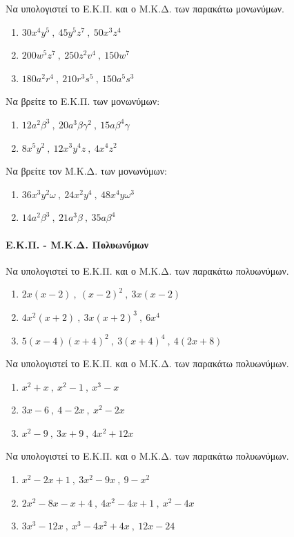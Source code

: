 \documentclass[11pt,a4paper,modern]{FFExercises}
\begin{document}
\askhsh
Να υπολογιστεί το Ε.Κ.Π. και ο Μ.Κ.Δ. των παρακάτω μονωνύμων.
\begin{enumerate}[label=\roman*.]
    \item $ 30x^4y^5\ ,\ 45y^5z^7\ ,\ 50x^3z^4 $
    \item $ 200w^5z^7\ ,\ 250z^2v^4\ ,\ 150w^7 $
    \item $ 180a^2r^4\ ,\ 210r^3s^5\ ,\ 150a^5s^3 $
\end{enumerate}

\askhsh
Να βρείτε το Ε.Κ.Π. των μονωνύμων:
\begin{enumerate}[label=\roman*.]
    \item $ 12a^2\beta^3\ ,\ 20a^3\beta\gamma^2\ ,\ 15a\beta^4\gamma $
    \item $ 8x^5y^2\ ,\ 12x^3y^4z\ ,\ 4x^4z^2 $
\end{enumerate}

\askhsh
Να βρείτε τον Μ.Κ.Δ. των μονωνύμων:
\begin{enumerate}[label=\roman*.]
    \item $ 36x^3y^2\omega\ ,\ 24x^2y^4\ ,\ 48x^4y\omega^3 $
    \item $ 14a^2\beta^3\ ,\ 21a^3\beta\ ,\ 35a\beta^4 $
\end{enumerate}

\paragraph{Ε.Κ.Π. - Μ.Κ.Δ. Πολυωνύμων}


\askhsh
Να υπολογιστεί το Ε.Κ.Π. και ο Μ.Κ.Δ. των παρακάτω πολυωνύμων.
\begin{enumerate}[label=\roman*.]
    \item $ 2x(x-2)\ ,\ (x-2)^2\ ,\ 3x(x-2) $
    \item $ 4x^2(x+2)\ ,\ 3x(x+2)^3\ ,\ 6x^4 $
    \item $ 5(x-4)(x+4)^2\ ,\ 3(x+4)^4\ ,\ 4(2x+8) $
\end{enumerate}

\askhsh
Να υπολογιστεί το Ε.Κ.Π. και ο Μ.Κ.Δ. των παρακάτω πολυωνύμων.
\begin{enumerate}[label=\roman*.]
    \item $ x^2+x\ ,\ x^2-1\ ,\ x^3-x $
    \item $ 3x-6\ ,\ 4-2x\ ,\ x^2-2x $
    \item $ x^2-9\ ,\ 3x+9\ ,\ 4x^2+12x $
\end{enumerate}

\askhsh
Να υπολογιστεί το Ε.Κ.Π. και ο Μ.Κ.Δ. των παρακάτω πολυωνύμων.
\begin{enumerate}[label=\roman*.]
    \item $ x^2-2x+1\ ,\ 3x^2-9x\ ,\ 9-x^2 $
    \item $ 2x^2-8x-x+4\ ,\ 4x^2-4x+1\ ,\ x^2-4x $
    \item $ 3x^3-12x\ ,\ x^3-4x^2+4x\ ,\ 12x-24 $
\end{enumerate}
\end{document}
